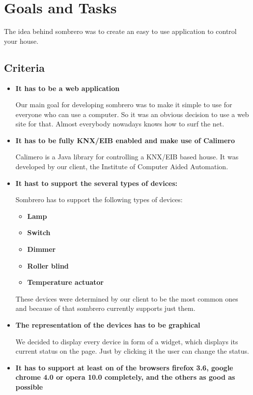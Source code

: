 \section{Goals and Tasks}
The idea behind sombrero was to create an easy to use application to control your house.
\subsection{Criteria}

  \begin{itemize}
    \item \textbf{It has to be a web application}
    
        Our main goal for developing sombrero was to make it simple to use for everyone who can use a computer. So it was an obvious decision to use a web site for that. Almost everybody nowadays knows how to surf the net.
    \item \textbf{It has to be fully KNX/EIB enabled and make use of Calimero}
        
        Calimero is a Java library for controlling a KNX/EIB based house. It was developed by our client, the Institute of Computer Aided Automation.
    \item \textbf{It hast to support the several types of devices:}
    
        Sombrero has to support the following types of devices:
            \begin{itemize}
                \item \textbf{Lamp}
                \item \textbf{Switch}
                \item \textbf{Dimmer}
                \item \textbf{Roller blind}
                \item \textbf{Temperature actuator}
            \end{itemize}
        These devices were determined by our client to be the most common ones and because of that sombrero currently supports just them.
    \item \textbf{The representation of the devices has to be graphical}
        
        We decided to display every device in form of a widget, which displays its current status on the page. Just by clicking it the user can change the status.
    \item \textbf{It has to support at least on of the browsers firefox 3.6, google chrome 4.0 or opera 10.0 completely, and the others as good as possible}
        

\end{itemize}
